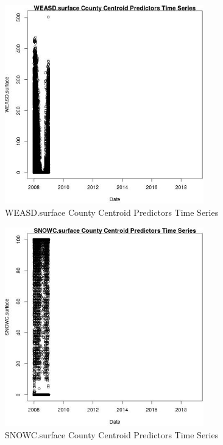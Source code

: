 \begin{figure} 
\centering  
\includegraphics[width=0.77\textwidth]{Code_Outputs/df_report_ML_predictors_CountyCentroid_Locations_Dates_2008-01-01to2018-12-31_WEASDsurfacevDate.jpg} 
\caption{\label{fig:df_report_ML_predictors_CountyCentroid_Locations_Dates_2008-01-01to2018-12-31WEASDsurfacevDate}WEASD.surface County Centroid Predictors Time Series} 
\end{figure} 
 

\begin{figure} 
\centering  
\includegraphics[width=0.77\textwidth]{Code_Outputs/df_report_ML_predictors_CountyCentroid_Locations_Dates_2008-01-01to2018-12-31_SNOWCsurfacevDate.jpg} 
\caption{\label{fig:df_report_ML_predictors_CountyCentroid_Locations_Dates_2008-01-01to2018-12-31SNOWCsurfacevDate}SNOWC.surface County Centroid Predictors Time Series} 
\end{figure} 
 

